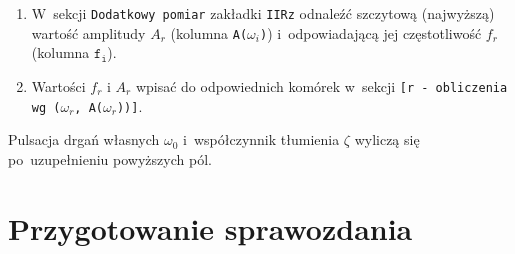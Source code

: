 \documentclass[paper=a4,DIV=12]{lpas}
\begin{document}
\begin{enumerate}
  \item W~sekcji \texttt{Dodatkowy pomiar} zakładki \texttt{IIRz} odnaleźć
    szczytową (najwyższą) wartość amplitudy $A_r$ (kolumna \texttt{A($\omega_i$)})
    i~odpowiadającą jej częstotliwość $f_r$ (kolumna $\texttt{f}_{\texttt{i}}$).
  \item Wartości $f_r$ i $A_r$ wpisać do odpowiednich komórek w~sekcji
    \texttt{[r - obliczenia wg ($\omega_r$, A($\omega_r$))]}.
\end{enumerate}
Pulsacja drgań własnych $\omega_0$ i~współczynnik tłumienia $\zeta$ wyliczą się
po~uzupełnieniu powyższych pól.

\section{Przygotowanie sprawozdania}
\label{sec:TFLLK}
\end{document}
